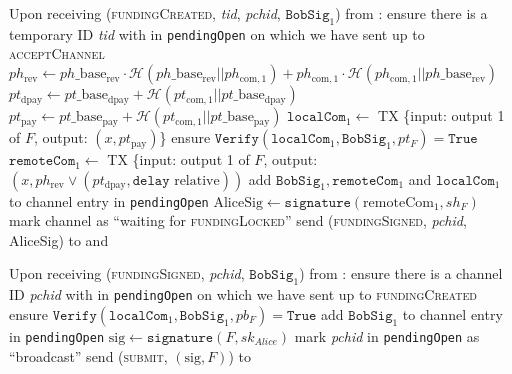 \begin{algorithmic}[1]
    \State Upon receiving (\textsc{fundingCreated}, \textit{tid},
    \textit{pchid}, $\mathtt{BobSig}_1$) from \bob:
    \Indent
      \State ensure there is a temporary ID \textit{tid} with \bob{} in
      \texttt{pendingOpen} on which we have sent up to \textsc{acceptChannel}
      \State $ph_{\mathrm{rev}} \gets ph\_\mathrm{base}_{\mathrm{rev}} \cdot
      \mathcal{H}\left(ph\_\mathrm{base}_{\mathrm{rev}} ||
      ph_{\mathrm{com}, 1}\right) + ph_{\mathrm{com}, 1} \cdot \mathcal{H}\left(
      ph_{\mathrm{com}, 1} || ph\_\mathrm{base}_{\mathrm{rev}}\right)$
      \State $pt_{\mathrm{dpay}} \gets pt\_\mathrm{base}_{\mathrm{dpay}} +
      \mathcal{H}\left(pt_{\mathrm{com}, 1} ||
      pt\_\mathrm{base}_{\mathrm{dpay}}\right)$
      \State $pt_{\mathrm{pay}} \gets pt\_\mathrm{base}_{\mathrm{pay}} +
      \mathcal{H}\left(pt_{\mathrm{com}, 1} ||
      pt\_\mathrm{base}_{\mathrm{pay}}\right)$
      \State $\mathtt{localCom}_1 \gets$ TX \{input: output 1 of $F$, output:
      $\left(x, pt_{\mathrm{pay}}\right)$\}
      \State ensure $\mathtt{Verify}\left(\mathtt{localCom}_1,
      \mathtt{BobSig}_1, pt_F\right) = \mathtt{True}$
      \State $\mathtt{remoteCom}_1 \gets$ TX \{input: output 1 of $F$, output:
      $\left(x, ph_{\mathrm{rev}} \vee \left(pt_{\mathrm{dpay}}, \mathtt{delay}
      \text{ relative}\right)\right)$ 
      \State add $\mathtt{BobSig}_1, \mathtt{remoteCom}_1$ and
      $\mathtt{localCom}_1$ to channel entry in \texttt{pendingOpen}
      \State $\mathrm{AliceSig} \gets
      \mathtt{signature}\left(\mathrm{remoteCom}_1, sh_F\right)$
      \State mark channel as ``waiting for \textsc{fundingLocked}''
      \State send (\textsc{fundingSigned}, \textit{pchid}, AliceSig) to \bob{}
      and \adversary
    \EndIndent
    \State

    \State Upon receiving (\textsc{fundingSigned}, \textit{pchid},
    $\mathtt{BobSig}_1$) from \bob:
    \Indent
      \State ensure there is a channel ID \textit{pchid} with \bob{} in
      \texttt{pendingOpen} on which we have sent up to \textsc{fundingCreated}
      \State ensure $\mathtt{Verify}\left(\mathtt{localCom}_1,
      \mathtt{BobSig}_1, pb_F\right) = \mathtt{True}$
      \State add $\mathtt{BobSig}_1$ to channel entry in \texttt{pendingOpen}
      \State $\mathrm{sig} \gets \mathtt{signature}\left(F,
      sk_{\mathit{Alice}}\right)$
      \State mark \textit{pchid} in \texttt{pendingOpen} as ``broadcast''
      \State send (\textsc{submit}, $\left(\mathrm{sig}, F\right)$) to \ledger
    \EndIndent
    \State


\end{algorithmic}
